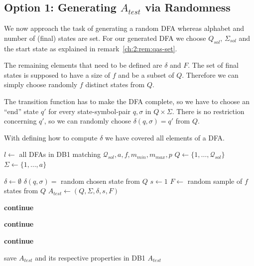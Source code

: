 \subsection{Option 1: Generating $A_{test}$ via Randomness}

We now approach the task of generating a random DFA whereas alphabet and number of (final) states are set. For our generated DFA we choose $Q_{sol}$, $\Sigma_{sol}$ and the start state as explained in remark~\ref{ch:2:rem:qas-set}.

The remaining elements that need to be defined are $\delta$ and $F$. The set of final states is supposed to have a size of $f$ and be a subset of $Q$. Therefore we can simply choose randomly $f$ distinct states from $Q$.

The transition function has to make the DFA complete, so we have to choose an ``end'' state $q'$ for every state-symbol-pair $q,\sigma$ in $Q \times \Sigma$. There is no restriction concerning $q'$, so we can randomly choose $\delta(q, \sigma) = q'$ from $Q$.

With defining how to compute $\delta$ we have covered all elements of a DFA.

\vspace{0.2cm}
\begin{algorithmic}[1]
	
		\vspace{0.2cm}
	
		\State $l \gets$ all DFAs in DB1 matching $\mathcal{Q}_{sol}, a, f, m_{min}, m_{max}, p$
		\State $Q \gets \{1, \ldots, \mathcal{Q}_{sol}\}$
		\State $\Sigma \gets \{1, \ldots, a\}$
		
		\vspace{0.2cm}
		
		
		\vspace{0.2cm}
		
			\State $\delta \gets \emptyset$
					\State $\delta(q,\sigma) = $ random chosen state from $Q$
				\EndFor
			\EndFor
			\State $s \gets 1$
			\State $F \gets$ random sample of $f$ states from $Q$
			\State $A_{test} \gets (Q, \Sigma, \delta, s, F)$
			
			\vspace{0.2cm}
			
			\State \textbf{continue}
			\EndIf
			
			\State \textbf{continue}
			\EndIf
			
			\State \textbf{continue}
			\EndIf
			
			\vspace{0.2cm}
			
			\State save $A_{test}$ and its respective properties in DB1
			\State\Return $A_{test}$
		\EndWhile
	\EndFunction
\end{algorithmic}
\vspace{0.2cm}

